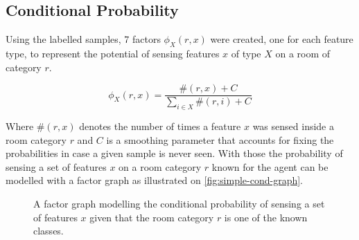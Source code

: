 \subsection{Conditional Probability}
Using the labelled samples, 7 factors $\phi_X(r,x)$ were created, one for each
feature type, to represent the potential of sensing features $x$ of type $X$ on
a room of category $r$.

\begin{equation}
\phi_X(r,x) = \frac{\#(r,x)+C}{\sum_{i \in X}{\#(r,i)+C}}
\end{equation}

Where $\#(r,x)$ denotes the number of times a feature $x$ was sensed inside a
room category $r$ and $C$ is a smoothing parameter that accounts for fixing
the probabilities in case a given sample is never seen.
With those the probability of sensing a set of features $x$ on a room category
$r$ known for the agent can be modelled with a factor graph as illustrated on
\autoref{fig:simple-cond-graph}.

\begin{figure}[h]
\centering
{}
\caption{\label{fig:simple-cond-graph}A factor graph modelling the conditional
probability of sensing a set of features $x$ given that the room category $r$ is
one of the known classes.}
\end{figure}

